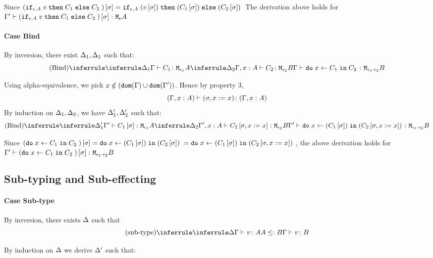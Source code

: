 {        Since $(\texttt{if}_{\epsilon, A}\; v\; \texttt{then}\; C_1 \;\texttt{else} \; C_2\;)\left[\sigma\right] = \texttt{if}_{\epsilon, A}\;(v\left[\sigma\right])\; \texttt{then}\; (C_1\left[\sigma\right]) \;\texttt{else} \;(C_2\left[\sigma\right])\;$ The derivation above holds for $\Gamma' \vdash (\texttt{if}_{\epsilon, A}\; v\; \texttt{then}\; C_1 \;\texttt{else} \; C_2\;)\left[\sigma\right] \colon \texttt{M}_{\epsilon}{A}$

    \paragraph{Case Bind}
        By inversion, there exist $\Delta_1, \Delta_2$ such that:
        \begin{equation}
            \ntreeruleII{Bind}{
                \treeruleI{\D_1}{\typerelation{\G}{C_1}{\M{\e_1}{A}}}
                }{
                \treeruleI{\D_2}{\typerelation{\G, x:A}{C_2}{\M{\e_2}{B}}}
            }{\typerelation{\G}{\doin{x}{C_1}{C_2}}{\M{\e_1\dot\e_2}{B}}}
        \end{equation}

        Using alpha-equivalence, we pick $x\notin(\texttt{dom}(\Gamma)\cup\texttt{dom}(\Gamma'))$. Hence by property 3, $$(\Gamma, x: A) \vdash (\sigma, x:= x) \colon (\Gamma, x: A)$$
        By induction on $\Delta_1, \Delta_2$, we have $\Delta_1', \Delta_2'$ such that:
        \begin{equation}
            \ntreeruleII{Bind}{
                \treeruleI{\D_1'}{\typerelation{\G'}{C_1\ssi}{\M{\e_1}{A}}}
                }{
                \treeruleI{\D_2}{\typerelation{\G', x:A}{C_2\sub{\si, x\setto x}}{\M{\e_2}{B}}}
            }{\typerelation{\G'}{\doin{x}{(C_1\ssi)}{(C_2\sub{\si, x\setto x})}}{\M{\e_1\dot\e_2}{B}}}
        \end{equation}

        Since $(\texttt{do}\; x \leftarrow C_1 \;\texttt{in}\; C_2\;)\left[\sigma\right] = \texttt{do}\; x \leftarrow (C_1\left[\sigma\right]) \;\texttt{in}\; (C_2\left[\sigma\right])\; = \texttt{do}\; x \leftarrow (C_1\left[\sigma\right]) \;\texttt{in}\; (C_2\left[\sigma, x:= x\right])\;$, the above derivation holds for $\Gamma' \vdash (\texttt{do}\; x \leftarrow C_1 \;\texttt{in}\; C_2\;)\left[\sigma\right] \colon \texttt{M}_{\epsilon_1\cdot\epsilon_2}{B}$
    \subsection{Sub-typing and Sub-effecting}
    \paragraph{Case Sub-type}
        By inversion, there exists $\Delta$ such that
        \begin{equation}
            \ntreeruleII{sub-type}{\treeruleI{\D}{\typerelation{\G}{v}{A}}}{ A\subtype B}{\typerelation{\G}{v}{B}}
        \end{equation}

        By induction on $\Delta$ we derive $\Delta'$ such that:

}
